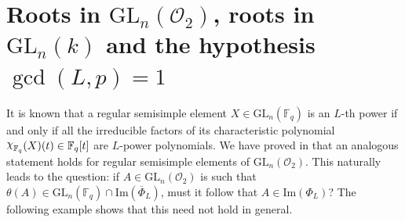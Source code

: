 \documentclass[11pt,twoside]{amsart}
\newcommand{\GL}{\mathrm{GL}}
\newcommand{\im}{\mathrm{Im}}
\newcommand{\upchi}{\raisebox{0.4ex}{$\chi$}}
\newcommand{\Char}{\upchi}
\newcommand{\R}{\mathscr{O}_2}
\newcommand{\Fq}{\mathbb{F}_q}
\theoremstyle{definition} %
\begin{document}
\section{Roots in $\GL_n(\R)$, roots in $\GL_n(k)$ and the hypothesis $\gcd(L,p)=1$}\label{sec:res-cond-L-p}
It is known \cite[Proposition 4.5]{KunduSinghGL} that a regular semisimple element $X \in \GL_n(\Fq)$ is an $L$-th power if and only if all the irreducible factors of its characteristic polynomial $\Char_{\Fq}(X)(t) \in \Fq[t]$ are $L$-power polynomials.
We have proved in  that an analogous statement holds for regular semisimple elements of $\GL_n(\R)$.
This naturally leads to the question: if $A \in \GL_n(\R)$ is such that $\theta(A) \in \GL_n(\Fq) \cap \im(\overline{\Phi}_L)$, must it follow that $A \in \im(\Phi_L)$?
The following example shows that this need not hold in general.

\end{document}
